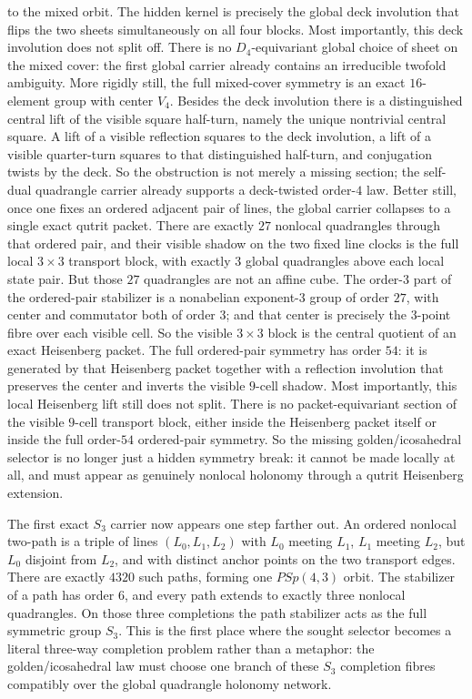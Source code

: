 \documentclass[12pt,a4paper]{article}
\def\mathrm#1{#1}%
\theoremstyle{definition}
\newcommand{\PSp}{\mathrm{PSp}}
\begin{document}
to the mixed orbit.  The hidden kernel is precisely the global deck
involution that flips the two sheets simultaneously on all four blocks.
Most importantly, this deck involution does not split off.  There is
no $D_4$-equivariant global choice of sheet on the mixed cover: the
first global carrier already contains an irreducible twofold ambiguity.
More rigidly still, the full mixed-cover symmetry is an exact
$16$-element group with center $V_4$.  Besides the deck involution there
is a distinguished central lift of the visible square half-turn, namely
the unique nontrivial central square.  A lift of a visible reflection
squares to the deck involution, a lift of a visible quarter-turn squares
to that distinguished half-turn, and conjugation twists by the deck.
So the obstruction is not merely a missing section; the self-dual
quadrangle carrier already supports a deck-twisted order-$4$ law.
Better still, once one fixes an ordered adjacent pair of lines, the
global carrier collapses to a single exact qutrit packet.  There are
exactly $27$ nonlocal quadrangles through that ordered pair, and their
visible shadow on the two fixed line clocks is the full local $3\times 3$
transport block, with exactly $3$ global quadrangles above each local
state pair.  But those $27$ quadrangles are not an affine cube.  The
order-$3$ part of the ordered-pair stabilizer is a nonabelian exponent-$3$
group of order $27$, with center and commutator both of order $3$; and
that center is precisely the $3$-point fibre over each visible cell.
So the visible $3\times 3$ block is the central quotient of an exact
Heisenberg packet.  The full ordered-pair symmetry has order $54$: it
is generated by that Heisenberg packet together with a reflection
involution that preserves the center and inverts the visible $9$-cell
shadow.  Most importantly, this local Heisenberg lift still does not
split.  There is no packet-equivariant section of the visible $9$-cell
transport block, either inside the Heisenberg packet itself or inside
the full order-$54$ ordered-pair symmetry.  So the missing
golden/icosahedral selector is no longer just a hidden symmetry break:
it cannot be made locally at all, and must appear as genuinely nonlocal
holonomy through a qutrit Heisenberg extension.

The first exact $S_3$ carrier now appears one step farther out.  An
ordered nonlocal two-path is a triple of lines $(L_0,L_1,L_2)$ with
$L_0$ meeting $L_1$, $L_1$ meeting $L_2$, but $L_0$ disjoint from
$L_2$, and with distinct anchor points on the two transport edges.
There are exactly $4320$ such paths, forming one $\PSp(4,3)$ orbit.
The stabilizer of a path has order $6$, and every path extends to
exactly three nonlocal quadrangles.  On those three completions the
path stabilizer acts as the full symmetric group $S_3$.  This is the
first place where the sought selector becomes a literal three-way
completion problem rather than a metaphor: the golden/icosahedral law
must choose one branch of these $S_3$ completion fibres compatibly over
the global quadrangle holonomy network.
\end{document}
